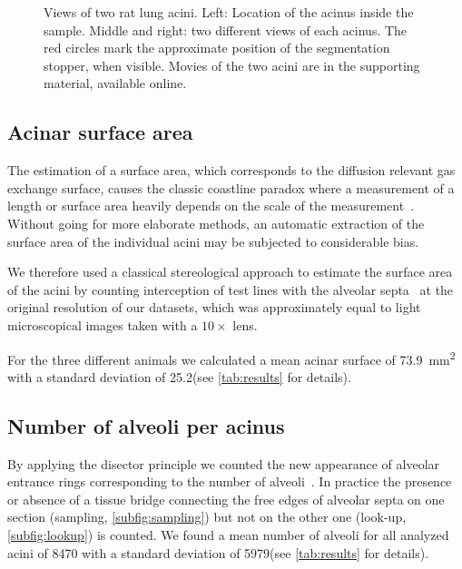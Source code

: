 \documentclass[paper=a4,DIV=calc,abstract,english]{scrartcl}
\newlength\imagescale		%
\newcommand{\meannumberofalveoli}{8470\xspace} %
\newcommand{\meannumberofalveoliSTD}{5979\xspace}
\newcommand{\meanacinarsurface}{73.9} %
\newcommand{\meanacinarsurfaceSTD}{25.2}
\begin{document}
\begin{figure}[htb]
{\begin{tikzpicture}[x=\imagescale,y=-\imagescale]
			\end{tikzpicture}%
		}%
	\caption{Views of two rat lung acini.
		Left: Location of the acinus inside the sample.
		Middle and right: two different views of each acinus.
		The red circles mark the approximate position of the segmentation stopper, when visible.
		Movies of the two acini are in the supporting material, available online.}
	\label{fig:acini}
\end{figure}

\subsection{Acinar surface area}\label{sec:results:acinar surface area}
The estimation of a surface area, which corresponds to the diffusion relevant gas exchange surface, causes the classic coastline paradox where a measurement of a length or surface area heavily depends on the scale of the measurement~\citep{Mandelbrot1967a}.
Without going for more elaborate methods, an automatic extraction of the surface area of the individual acini may be subjected to considerable bias.



We therefore used a classical stereological approach to estimate the surface area of the acini by counting interception of test lines with the alveolar septa~\citep{Hsia2010} at the original resolution of our datasets, which was approximately equal to light microscopical images taken with a \(10\times\) lens.

For the three different animals we calculated a mean acinar surface of \SI{\meanacinarsurface}{\milli\meter\squared} with a standard deviation of \meanacinarsurfaceSTD\xspace (see \autoref{tab:results} for details).

\subsection{Number of alveoli per acinus}
By applying the disector principle we counted the new appearance of alveolar entrance rings corresponding to the number of alveoli~\citep{Sterio1984,Hyde2004,Ochs2003}.
In practice the presence or absence of a tissue bridge connecting the free edges of alveolar septa on one section (sampling, \autoref{subfig:sampling}) but not on the other one (look-up, \autoref{subfig:lookup}) is counted. We found a mean number of alveoli for all analyzed acini of \meannumberofalveoli with a standard deviation of \meannumberofalveoliSTD (see \autoref{tab:results} for details).
\end{document}
